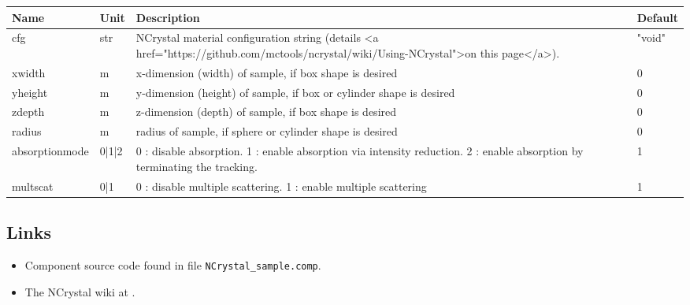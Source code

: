 \begin{longtable}{p{}p{}p{}p{}}
\toprule
\textbf{Name} & \textbf{Unit} & \textbf{Description} & \textbf{Default} \\
\midrule
\endhead
cfg & str & NCrystal material configuration string (details \textless{}a href="https://github.com/mctools/ncrystal/wiki/Using-NCrystal"\textgreater{}on this page\textless{}/a\textgreater{}). & "void" \\
xwidth & m & x-dimension (width) of sample, if box shape is desired & 0 \\
yheight & m & y-dimension (height) of sample, if box or cylinder shape is desired & 0 \\
zdepth & m & z-dimension (depth) of sample, if box shape is desired & 0 \\
radius & m & radius of sample, if sphere or cylinder shape is desired & 0 \\
absorptionmode & 0|1|2 & 0 : disable absorption. 1 : enable absorption via intensity reduction. 2 : enable absorption by terminating the tracking. & 1 \\
multscat & 0|1 & 0 : disable multiple scattering. 1 : enable multiple scattering & 1 \\
\bottomrule
\end{longtable}

\subsection*{Links}
\begin{itemize}
  \item Component source code found in file \texttt{NCrystal\_sample.comp}.
  \item The NCrystal wiki at .
\end{itemize}
